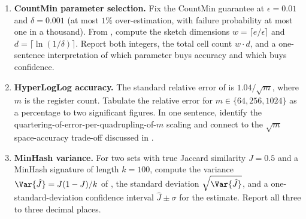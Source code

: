 \begin{enumerate}


\item \exstar
\label{ex:ch10-1}
\textbf{CountMin parameter selection.}
Fix the CountMin guarantee at $\epsilon = 0.01$ and $\delta = 0.001$
(at most $1\%$ over-estimation, with failure probability at most
one in a thousand). From , compute the
sketch dimensions $w = \lceil e / \epsilon \rceil$ and $d =
\lceil \ln(1 / \delta) \rceil$. Report both integers, the total
cell count $w \cdot d$, and a one-sentence interpretation of which
parameter buys accuracy and which buys confidence.

\item \exstar
\label{ex:ch10-2}
\textbf{HyperLogLog accuracy.}
The standard relative error of  is
$1.04 / \sqrt{m}$, where $m$ is the register count. Tabulate the
relative error for $m \in \{64, 256, 1024\}$ as a percentage to
two significant figures. In one sentence, identify the
quartering-of-error-per-quadrupling-of-$m$ scaling and connect to
the $\sqrt{m}$ space-accuracy trade-off discussed in
.

\item \exstar
\label{ex:ch10-3}
\textbf{MinHash variance.}
For two sets with true Jaccard similarity $J = 0.5$ and a MinHash
signature of length $k = 100$, compute the variance
$\Var{\hat{J}} = J(1 - J) / k$ of , the
standard deviation $\sqrt{\Var{\hat{J}}}$, and a one-standard-deviation
confidence interval $\hat{J} \pm \sigma$ for the estimate. Report
all three to three decimal places.



\end{enumerate}
